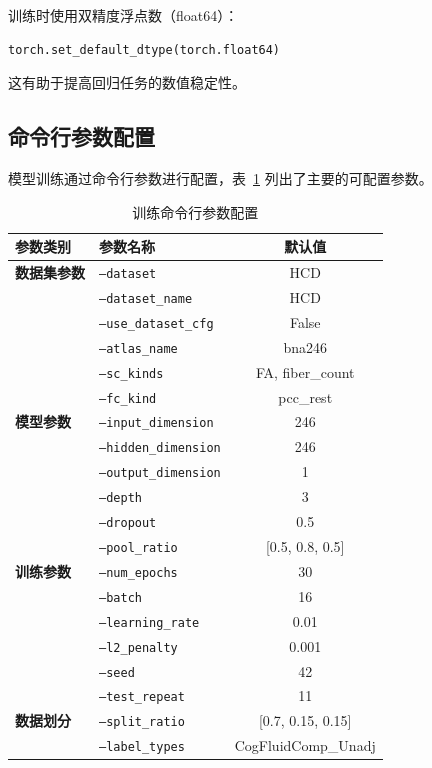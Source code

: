 训练时使用双精度浮点数（float64）：
\begin{verbatim}
torch.set_default_dtype(torch.float64)
\end{verbatim}

这有助于提高回归任务的数值稳定性。

\subsection{命令行参数配置}

模型训练通过命令行参数进行配置，表~\ref{tab:cmd_params} 列出了主要的可配置参数。

\begin{table}[htbp]
\centering
\caption{训练命令行参数配置}
\label{tab:cmd_params}
\begin{tabular}{llc}
\toprule
参数类别 & 参数名称 & 默认值 \\
\midrule
\midrule
\textbf{数据集参数} & \texttt{--dataset} & HCD \\
 & \texttt{--dataset\_name} & HCD \\
 & \texttt{--use\_dataset\_cfg} & False \\
 & \texttt{--atlas\_name} & bna246 \\
 & \texttt{--sc\_kinds} & FA, fiber\_count \\
 & \texttt{--fc\_kind} & pcc\_rest \\
\midrule
\textbf{模型参数} & \texttt{--input\_dimension} & 246 \\
 & \texttt{--hidden\_dimension} & 246 \\
 & \texttt{--output\_dimension} & 1 \\
 & \texttt{--depth} & 3 \\
 & \texttt{--dropout} & 0.5 \\
 & \texttt{--pool\_ratio} & [0.5, 0.8, 0.5] \\
\midrule
\textbf{训练参数} & \texttt{--num\_epochs} & 30 \\
 & \texttt{--batch} & 16 \\
 & \texttt{--learning\_rate} & 0.01 \\
 & \texttt{--l2\_penalty} & 0.001 \\
 & \texttt{--seed} & 42 \\
 & \texttt{--test\_repeat} & 11 \\
\midrule
\textbf{数据划分} & \texttt{--split\_ratio} & [0.7, 0.15, 0.15] \\
 & \texttt{--label\_types} & CogFluidComp\_Unadj \\
\midrule

\end{tabular}
\end{table}
